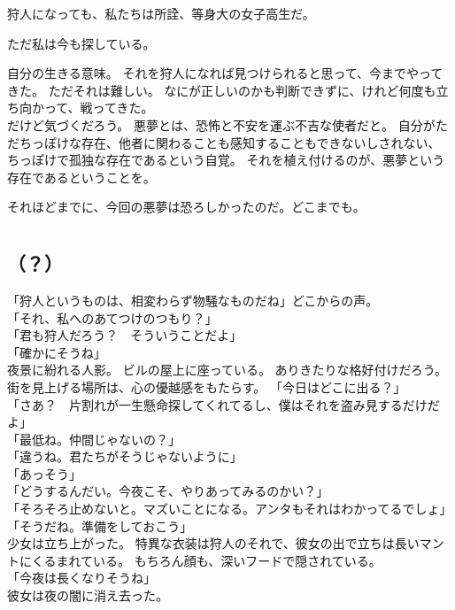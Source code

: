 \documentclass[../IHMain]{subfiles}
\begin{document}
狩人になっても、私たちは所詮、等身大の女子高生だ。

ただ私は今も探している。

自分の生きる意味。
それを狩人になれば見つけられると思って、今までやってきた。
ただそれは難しい。
なにが正しいのかも判断できずに、けれど何度も立ち向かって、戦ってきた。\\

だけど気づくだろう。
悪夢とは、恐怖と不安を運ぶ不吉な使者だと。
自分がただちっぽけな存在、他者に関わることも感知することもできないしされない、
ちっぽけで孤独な存在であるという自覚。
それを植え付けるのが、悪夢という存在であるということを。

それほどまでに、今回の悪夢は恐ろしかったのだ。どこまでも。

\section{}
\subsection*{（？）}
「狩人というものは、相変わらず物騒なものだね」どこからの声。\\
「それ、私へのあてつけのつもり？」\\
「君も狩人だろう？　そういうことだよ」\\
「確かにそうね」\\
夜景に紛れる人影。
ビルの屋上に座っている。
ありきたりな格好付けだろう。
街を見上げる場所は、心の優越感をもたらす。
「今日はどこに出る？」\\
「さあ？　片割れが一生懸命探してくれてるし、僕はそれを盗み見するだけだよ」\\
「最低ね。仲間じゃないの？」\\
「違うね。君たちがそうじゃないように」\\
「あっそう」\\
「どうするんだい。今夜こそ、やりあってみるのかい？」\\
「そろそろ止めないと。マズいことになる。アンタもそれはわかってるでしょ」\\
「そうだね。準備をしておこう」\\

少女は立ち上がった。
特異な衣装は狩人のそれで、彼女の出で立ちは長いマントにくるまれている。
もちろん顔も、深いフードで隠されている。\\
「今夜は長くなりそうね」\\
彼女は夜の闇に消え去った。
\end{document}

